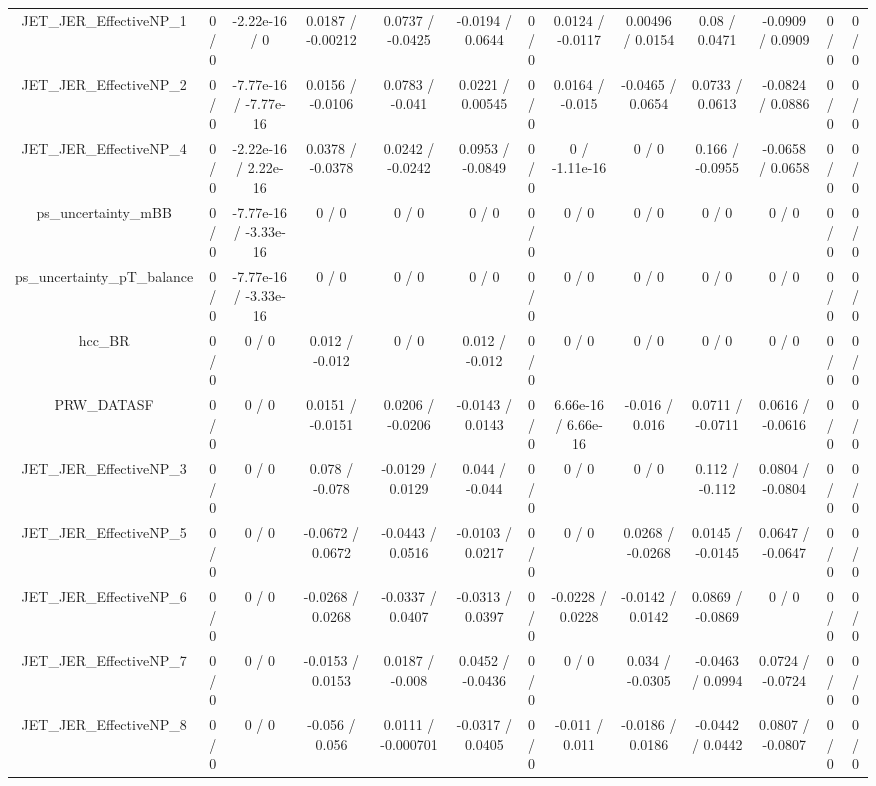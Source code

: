 \documentclass[10pt]{article}
\begin{document}
\begin{table}[htbp]
\begin{center}
\begin{tabular}{|c|c|c|c|c|c|c|c|c|c|c|c|c|}
  JET_JER_EffectiveNP_1 & 0 / 0 & -2.22e-16 / 0 & 0.0187 / -0.00212 & 0.0737 / -0.0425 & -0.0194 / 0.0644 & 0 / 0 & 0.0124 / -0.0117 & 0.00496 / 0.0154 & 0.08 / 0.0471 & -0.0909 / 0.0909 & 0 / 0 & 0 / 0 \\ 
  JET_JER_EffectiveNP_2 & 0 / 0 & -7.77e-16 / -7.77e-16 & 0.0156 / -0.0106 & 0.0783 / -0.041 & 0.0221 / 0.00545 & 0 / 0 & 0.0164 / -0.015 & -0.0465 / 0.0654 & 0.0733 / 0.0613 & -0.0824 / 0.0886 & 0 / 0 & 0 / 0 \\ 
  JET_JER_EffectiveNP_4 & 0 / 0 & -2.22e-16 / 2.22e-16 & 0.0378 / -0.0378 & 0.0242 / -0.0242 & 0.0953 / -0.0849 & 0 / 0 & 0 / -1.11e-16 & 0 / 0 & 0.166 / -0.0955 & -0.0658 / 0.0658 & 0 / 0 & 0 / 0 \\ 
  ps_uncertainty_mBB & 0 / 0 & -7.77e-16 / -3.33e-16 & 0 / 0 & 0 / 0 & 0 / 0 & 0 / 0 & 0 / 0 & 0 / 0 & 0 / 0 & 0 / 0 & 0 / 0 & 0 / 0 \\ 
  ps_uncertainty_pT_balance & 0 / 0 & -7.77e-16 / -3.33e-16 & 0 / 0 & 0 / 0 & 0 / 0 & 0 / 0 & 0 / 0 & 0 / 0 & 0 / 0 & 0 / 0 & 0 / 0 & 0 / 0 \\ 
  hcc_BR & 0 / 0 & 0 / 0 & 0.012 / -0.012 & 0 / 0 & 0.012 / -0.012 & 0 / 0 & 0 / 0 & 0 / 0 & 0 / 0 & 0 / 0 & 0 / 0 & 0 / 0 \\ 
  PRW_DATASF & 0 / 0 & 0 / 0 & 0.0151 / -0.0151 & 0.0206 / -0.0206 & -0.0143 / 0.0143 & 0 / 0 & 6.66e-16 / 6.66e-16 & -0.016 / 0.016 & 0.0711 / -0.0711 & 0.0616 / -0.0616 & 0 / 0 & 0 / 0 \\ 
  JET_JER_EffectiveNP_3 & 0 / 0 & 0 / 0 & 0.078 / -0.078 & -0.0129 / 0.0129 & 0.044 / -0.044 & 0 / 0 & 0 / 0 & 0 / 0 & 0.112 / -0.112 & 0.0804 / -0.0804 & 0 / 0 & 0 / 0 \\ 
  JET_JER_EffectiveNP_5 & 0 / 0 & 0 / 0 & -0.0672 / 0.0672 & -0.0443 / 0.0516 & -0.0103 / 0.0217 & 0 / 0 & 0 / 0 & 0.0268 / -0.0268 & 0.0145 / -0.0145 & 0.0647 / -0.0647 & 0 / 0 & 0 / 0 \\ 
  JET_JER_EffectiveNP_6 & 0 / 0 & 0 / 0 & -0.0268 / 0.0268 & -0.0337 / 0.0407 & -0.0313 / 0.0397 & 0 / 0 & -0.0228 / 0.0228 & -0.0142 / 0.0142 & 0.0869 / -0.0869 & 0 / 0 & 0 / 0 & 0 / 0 \\ 
  JET_JER_EffectiveNP_7 & 0 / 0 & 0 / 0 & -0.0153 / 0.0153 & 0.0187 / -0.008 & 0.0452 / -0.0436 & 0 / 0 & 0 / 0 & 0.034 / -0.0305 & -0.0463 / 0.0994 & 0.0724 / -0.0724 & 0 / 0 & 0 / 0 \\ 
  JET_JER_EffectiveNP_8 & 0 / 0 & 0 / 0 & -0.056 / 0.056 & 0.0111 / -0.000701 & -0.0317 / 0.0405 & 0 / 0 & -0.011 / 0.011 & -0.0186 / 0.0186 & -0.0442 / 0.0442 & 0.0807 / -0.0807 & 0 / 0 & 0 / 0 \\ 

\end{tabular}
\end{center}
\end{table}
\end{document}
